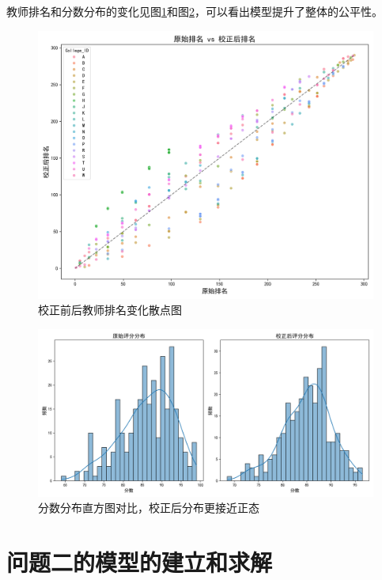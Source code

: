 \documentclass[withoutpreface,bwprint]{cumcmthesis}
\begin{document}
教师排名和分数分布的变化见图\ref{fig:rank_comparison_scatter}和图\ref{fig:score_distributions_comparison}，可以看出模型提升了整体的公平性。

\begin{figure}[H]
\centering
\includegraphics[width=1\textwidth]{figures/Results_Visualization/rank_comparison_scatter.png}
\caption{校正前后教师排名变化散点图}
\label{fig:rank_comparison_scatter}
\end{figure}

\begin{figure}[H]
\centering
\includegraphics[width=1\textwidth]{figures/Results_Visualization/score_distributions_comparison.png}
\caption{分数分布直方图对比，校正后分布更接近正态}
\label{fig:score_distributions_comparison}
\end{figure}



\section{问题二的模型的建立和求解}
\end{document}
